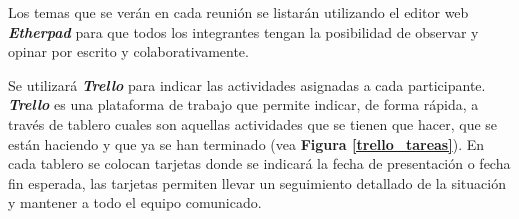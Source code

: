 Los temas que se verán en cada reunión se listarán utilizando el editor web \textbf{\textit{Etherpad}} para que todos los integrantes tengan la posibilidad de observar y opinar por escrito y colaborativamente.

{\correccionTexto
Se utilizará \textbf{\textit{Trello}} para indicar las actividades asignadas a cada participante. \textbf{\textit{Trello}} es una plataforma de trabajo que permite indicar, de forma rápida, a través de tablero cuales son aquellas actividades que se tienen que hacer, que se están haciendo y que ya se han terminado (vea \textbf{Figura \ref{trello_tareas}}). En cada tablero  se colocan tarjetas donde se indicará la fecha de presentación o fecha fin esperada, las tarjetas permiten llevar un seguimiento detallado de la situación y mantener a todo el equipo comunicado.
}

